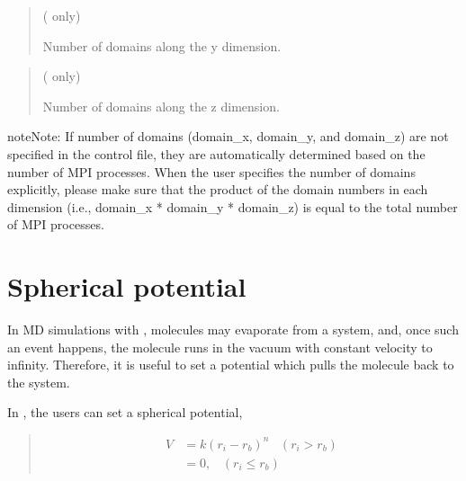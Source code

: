 \documentclass[a4paper,11pt,oneside,english]{sphinxmanual}
\begin{document}
 
\begin{quote}

 ( only)

Number of domains along the y dimension.
\end{quote}

 
\begin{quote}

 ( only)

Number of domains along the z dimension.
\end{quote}

\begin{sphinxadmonition}{note}{Note:}
If number of domains (domain\_x, domain\_y, and domain\_z) are not specified
in the control file, they are automatically determined based on the
number of MPI processes.
When the user specifies the number of domains explicitly,
please make sure that the product of the domain numbers in each dimension
(i.e., domain\_x * domain\_y * domain\_z) is equal to the total number of
MPI processes.
\end{sphinxadmonition}


\section{Spherical potential}
\label{\detokenize{10_Boundary:spherical-potential}}
In MD simulations with , molecules may evaporate from a system,
and, once such an event happens, the molecule runs in the vacuum with
constant velocity to infinity. Therefore, it is useful to set a
potential which pulls the molecule back to the system.

In , the users can set a spherical potential,
\begin{quote}
\begin{equation*}
\begin{split}V & = k (r_i - r_b)^n \hspace{10pt} ( r_i > r_b) \\
  & = 0,              \hspace{10pt} ( r_i \leq r_b)\end{split}
\end{equation*}\end{quote}
\end{document}
